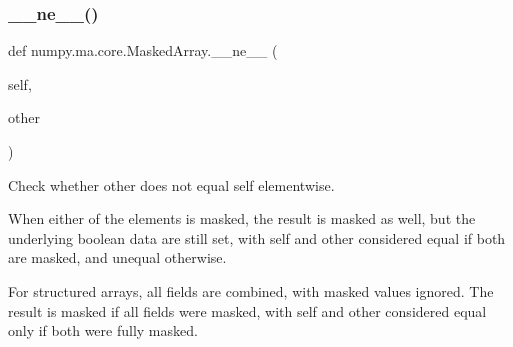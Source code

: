 \subsubsection{\texorpdfstring{\+\_\+\+\_\+ne\+\_\+\+\_\+()}{\_\_ne\_\_()}}
{\footnotesize\ttfamily def numpy.\+ma.\+core.\+Masked\+Array.\+\_\+\+\_\+ne\+\_\+\+\_\+ (\begin{DoxyParamCaption}\item[{}]{self,  }\item[{}]{other }\end{DoxyParamCaption})}

\begin{DoxyVerb}Check whether other does not equal self elementwise.

When either of the elements is masked, the result is masked as well,
but the underlying boolean data are still set, with self and other
considered equal if both are masked, and unequal otherwise.

For structured arrays, all fields are combined, with masked values
ignored. The result is masked if all fields were masked, with self
and other considered equal only if both were fully masked.
\end{DoxyVerb}
 \mbox{\label{classnumpy_1_1ma_1_1core_1_1MaskedArray_ad2adc7e3de4ed3ca992b102004a977a6}} 
